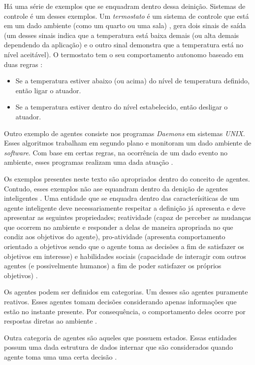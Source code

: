 Há uma série de exemplos que se enquadram dentro dessa deinição. Sistemas de controle é um desses exemplos. Um \textit{termostato} é um sistema de controle que está em um dado ambiente 
(como um quarto ou uma sala) \cite{whatisagent}, gera dois sinais de saída (um desses sinais indica que a temperatura está baixa demais (ou alta demais dependendo da aplicação) e o outro sinal
demonstra que a temperatura está no nível aceitável). O termostato tem o seu comportamento autonomo baseado em duas regras \cite{whatisagent}:

\begin{itemize}
    \item Se a temperatura estiver abaixo (ou acima) do nível de temperatura definido, então ligar o atuador.
    \item Se a temperatura estiver dentro do nível estabelecido, então desligar o atuador.
\end{itemize}

Outro exemplo de agentes consiste nos programas \textit{Daemons} em sistemas \textit{UNIX}. Esses algoritmos trabalham em segundo plano e monitoram um dado ambiente de \textit{software}. Com base
em certas regras, na ocorrência de um dado evento no ambiente, esses programas realizam uma dada atuação \cite{whatisagent}.   

Os exemplos presentes neste texto são apropriados dentro do conceito de agentes. Contudo, esses exemplos não ase equandram dentro da denição de agentes inteligentes \cite{whatisagent}. Uma entidade que se enquadra
dentro das caracterísiticas de um agente inteligente deve necessariamente respeitar a definição já apresenta e deve apresentar as seguintes propriedades; reatividade (capaz de perceber as mudanças
que ocorrem no ambiente e responder a delas de maneira apropriada no que condiz aos objetivos do agente), pro-atividade (apresenta comportamento orientado a objetivos sendo que o agente toma as decisões
a fim de satisfazer os objetivos em interesse) e habilidades sociais (capacidade de interagir com outros agentes (e possivelmente humanos) a fim de poder satisfazer os próprios objetivos) \cite{whatisagent} \cite{artificialinteligencemodermapproach}.

Os agentes podem ser definidos em categorias. Um desses são agentes puramente reativos. Esses agentes tomam decisões considerando apenas informações que estão no instante presente. Por consequência, 
o comportamento deles ocorre por respostas diretas ao ambiente \cite{whatisagent}. 

Outra categoria de agentes são aqueles que possuem estados. Essas entidades possum uma dada estrutura de dados internar que são considerados quando agente toma uma uma certa decisão \cite{whatisagent}.

